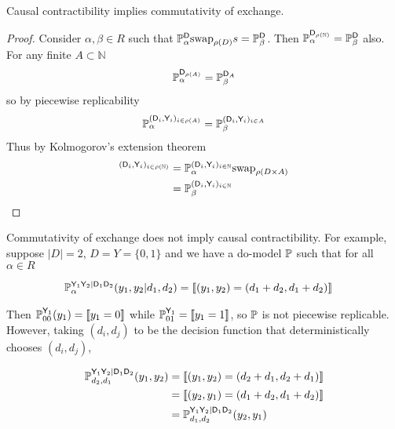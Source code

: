 \begin{theorem}
Causal contractibility implies commutativity of exchange.
\end{theorem}

\begin{proof}
Consider $\alpha,\beta\in R$ such that $\mathbb{P}_\alpha^{\mathsf{D}}\text{swap}_{\rho(D)} s= \mathbb{P}_{\beta}^{\mathsf{D}}$. Then  $\mathbb{P}_\alpha^{\mathsf{D}_{\rho(\mathbb{N})}} = \mathbb{P}_{\beta}^{\mathsf{D}}$ also. For any finite $A\subset \mathbb{N}$
\begin{align}
    \mathbb{P}_\alpha^{\mathsf{D}_{\rho(A)}} = \mathbb{P}_{\beta}^{\mathsf{D}_A}
\end{align}
so by piecewise replicability
\begin{align}
    \mathbb{P}_\alpha^{(\mathsf{D}_i,\mathsf{Y}_i)_{i\in \rho(A)}} = \mathbb{P}_{\beta}^{(\mathsf{D}_i,\mathsf{Y}_i)_{i\in A}}
\end{align}
Thus by Kolmogorov's extension theorem
\begin{align}
    ^{(\mathsf{D}_i,\mathsf{Y}_i)_{i\in \rho(\mathbb{N})}} &= \mathbb{P}_\alpha^{(\mathsf{D}_i,\mathsf{Y}_i)_{i\in \mathbb{N}}}\text{swap}_{\rho(D\times A)}\\
                                         &= \mathbb{P}_{\beta}^{(\mathsf{D}_i,\mathsf{Y}_i)_{i\in \mathbb{N}}}
\end{align}
\end{proof}

Commutativity of exchange does not imply causal contractibility. For example, suppose $|D|=2$, $D=Y=\{0,1\}$ and we have a do-model $\mathbb{P}$ such that for all $\alpha\in R$

\begin{align}
    \mathbb{P}_\alpha^{\mathsf{Y}_1\mathsf{Y}_2|\mathsf{D}_1\mathsf{D}_2}(y_1,y_2|d_1,d_2) &= \llbracket (y_1,y_2)= (d_1+d_2,d_1+d_2) \rrbracket
\end{align}

Then $\mathbb{P}_{00}^{\mathsf{Y}_1}(y_1) = \llbracket y_1=0\rrbracket$ while $\mathbb{P}_{01}^{\mathsf{Y}_1} = \llbracket y_1=1 \rrbracket$, so $\mathbb{P}$ is not piecewise replicable. However, taking $(d_i,d_j)$ to be the decision function that deterministically chooses $(d_i,d_j)$,

\begin{align}
    \mathbb{P}_{d_2,d_1}^{\mathsf{Y}_1\mathsf{Y}_2|\mathsf{D}_1\mathsf{D}_2}(y_1,y_2) &= \llbracket (y_1,y_2)= (d_2+d_1,d_2+d_1) \rrbracket\\
    &= \llbracket (y_2,y_1)= (d_1+d_2,d_1+d_2) \rrbracket\\
    &= \mathbb{P}_{d_1,d_2}^{\mathsf{Y}_1\mathsf{Y}_2|\mathsf{D}_1\mathsf{D}_2}(y_2,y_1)
\end{align}

